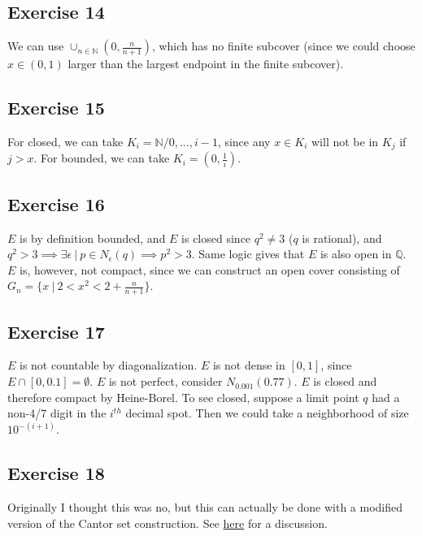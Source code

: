 \subsection{Exercise 14}
We can use $\cup_{n \in \mathbb{N}} (0, \frac{n}{n + 1})$, which has no finite subcover
(since we could choose $x \in (0, 1)$ larger than the largest endpoint in the finite subcover).

\subsection{Exercise 15}
For closed, we can take $K_i = \mathbb{N} / {0, ..., i - 1}$, since any $x \in K_i$ will not
be in $K_j$ if $j > x$. For bounded, we can take $K_i = (0, \frac{1}{i})$.

\subsection{Exercise 16}
$E$ is by definition bounded, and $E$ is closed since $q^2 \neq 3$ ($q$ is rational), and
$q^2 > 3 \implies \exists \epsilon \: | \: p  \in N_{\epsilon}(q) \implies p^2 > 3$. Same
logic gives that $E$ is also open in $\mathbb{Q}$. $E$ is, however, not compact, since
we can construct an open cover consisting of $G_n = \{x \: | \: 2 < x^2 < 2 + \frac{n}{n+1}\}$.

\subsection{Exercise 17}
$E$ is not countable by diagonalization. $E$ is not dense in $[0, 1]$, since $E \cap [0, 0.1] = \emptyset$.
$E$ is not perfect, consider $N_{0.001}(0.77)$. $E$ is closed and therefore compact by Heine-Borel.
To see closed, suppose a limit point $q$ had a non-4/7 digit in the $i^{th}$ decimal spot. Then we could
take a neighborhood of size $10^{-(i + 1)}$.

\subsection{Exercise 18}
Originally I thought this was no, but this can actually be done with a modified version of the Cantor set 
construction. See \href{https://math.stackexchange.com/questions/1064/perfect-set-without-rationals}{here} for
a discussion.
